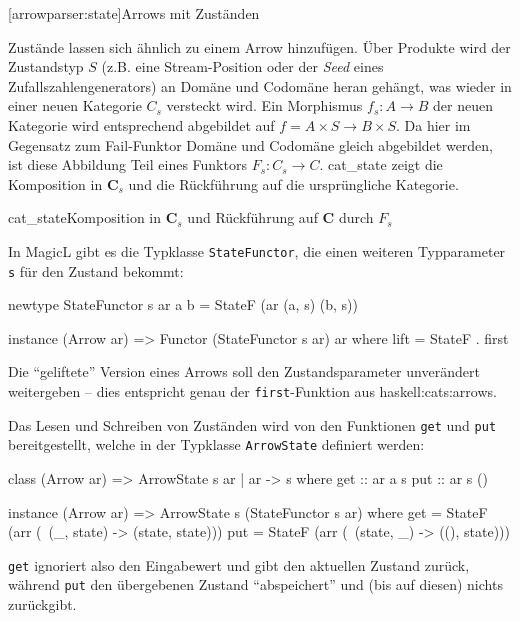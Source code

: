 \documentclass[12pt, a4paper, bibgerm]{scrbook}
\newenvironment{DIFnomarkup}{}{}
\newcommand\icode[1]{\lstinline?#1?}
\newcommand\lsection{}
\newcommand\sref{}
\newcommand\abb{}
\newcommand\fig{}
\newcommand\ato{\rightarrow} %
\begin{document}
\lsection[arrowparser:state]{Arrows mit Zuständen}

Zustände lassen sich ähnlich zu einem Arrow hinzufügen. Über Produkte
wird der Zustandstyp $S$ (z.B. eine Stream-Position oder der
\textit{Seed} eines Zufallszahlengenerators) an Domäne und Codomäne
heran gehängt, was wieder in einer neuen Kategorie $C_{s}$ versteckt
wird. Ein Morphismus $f_{s} : A \rightarrow B$ der neuen Kategorie
wird entsprechend abgebildet auf $f = A \times S \rightarrow B \times
S$. Da hier im Gegensatz zum Fail-Funktor Domäne und Codomäne gleich
abgebildet werden, ist diese Abbildung Teil eines Funktors $F_s: C_{s}
\ato C$. \abb{cat_state} zeigt die Komposition in $\mathbf{C}_s$ und die
Rückführung auf die ursprüngliche Kategorie.

\fig{cat_state}{Komposition in $\mathbf{C}_s$ und Rückführung auf
  $\mathbf{C}$ durch $F_s$}

In MagicL gibt es die Typklasse \icode{StateFunctor}, die einen weiteren
Typparameter \icode{s} für den Zustand bekommt:

\begin{DIFnomarkup}\begin{code}
newtype StateFunctor s ar a b = StateF (ar (a, s) (b, s))

instance (Arrow ar) => Functor (StateFunctor s ar) ar where
    lift = StateF . first
\end{code}\end{DIFnomarkup} %

Die "`geliftete"' Version eines Arrows soll den Zustandsparameter
unverändert weitergeben -- dies entspricht genau der
\icode{first}-Funktion aus \sref{haskell:cats:arrows}.

Das Lesen und Schreiben von Zuständen wird von den Funktionen \icode{get} und
\icode{put} bereitgestellt, welche in der Typklasse \icode{ArrowState}
definiert werden:

\begin{DIFnomarkup}\begin{code}
class (Arrow ar) => ArrowState s ar | ar -> s where
  get :: ar a s
  put :: ar s ()

instance (Arrow ar) => ArrowState s (StateFunctor s ar)
  where
    get = StateF (arr (\ (_, state) -> (state, state)))
    put = StateF (arr (\ (state, _) -> ((), state)))
\end{code}\end{DIFnomarkup}

\icode{get} ignoriert also den Eingabewert und gibt den aktuellen
Zustand zurück, während \icode{put} den übergebenen Zustand
"`abspeichert"' und (bis auf diesen) nichts zurückgibt.
\end{document}
